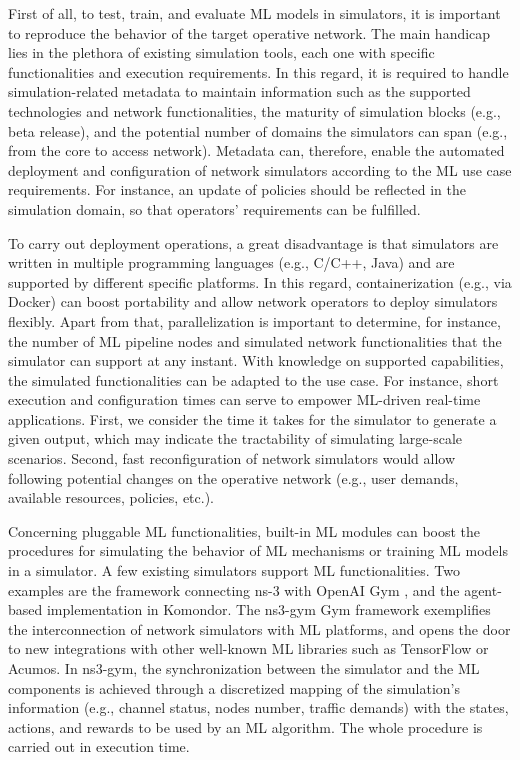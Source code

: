 \documentclass[journal]{IEEEtran}
\begin{document}
	First of all, to test, train, and evaluate ML models in simulators, it is important to reproduce the behavior of the target operative network. The main handicap lies in the plethora of existing simulation tools, each one with specific functionalities and execution requirements. In this regard, it is required to handle simulation-related metadata to maintain information such as the supported technologies and network functionalities, the maturity of simulation blocks (e.g., beta release), and the potential number of domains the simulators can span (e.g., from the core to access network). Metadata can, therefore, enable the automated deployment and configuration of network simulators according to the ML use case requirements. For instance, an update of policies should be reflected in the simulation domain, so that operators' requirements can be fulfilled.
	
	To carry out deployment operations, a great disadvantage is that simulators are written in multiple programming languages (e.g., C/C++, Java) and are supported by different specific platforms. In this regard, containerization (e.g., via Docker) can boost portability and allow network operators to deploy simulators flexibly. Apart from that, parallelization is important to determine, for instance, the number of ML pipeline nodes and simulated network functionalities that the simulator can support at any instant. With knowledge on supported capabilities, the simulated functionalities can be adapted to the use case. For instance, short execution and configuration times can serve to empower ML-driven real-time applications. First, we consider the time it takes for the simulator to generate a given output, which may indicate the tractability of simulating large-scale scenarios. Second, fast reconfiguration of network simulators would allow following potential changes on the operative network (e.g., user demands, available resources, policies, etc.).
	
	Concerning pluggable ML functionalities, built-in ML modules can boost the procedures for simulating the behavior of ML mechanisms or training ML models in a simulator. A few existing simulators support ML functionalities. Two examples are the framework connecting ns-3 with OpenAI Gym \cite{gawlowicz2019ns}, and the agent-based implementation in Komondor. The ns3-gym Gym framework exemplifies the interconnection of network simulators with ML platforms, and opens the door to new integrations with other well-known ML libraries such as TensorFlow or Acumos. In ns3-gym, the synchronization between the simulator and the ML components is achieved through a discretized mapping of the simulation's information (e.g., channel status, nodes number, traffic demands) with the states, actions, and rewards to be used by an ML algorithm. The whole procedure is carried out in execution time.
	
\end{document}
